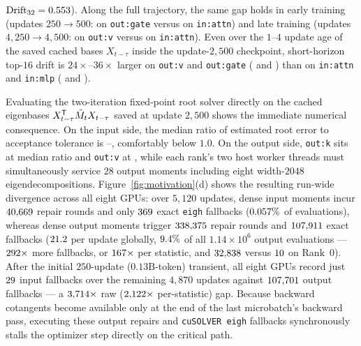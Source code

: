  $\mathrm{Drift}_{32} = 0.553{}$).
Along the full  trajectory, the same gap holds in early training (updates $250\to 500$:
\motOutGateEarlyDriftTopSixteen{} on \texttt{out:gate} versus
\motInAttnEarlyDriftTopSixteen{} on \texttt{in:attn}) and late training (updates
$4{,}250\to 4{,}500$: \motOutVLateDriftTopSixteen{} on \texttt{out:v} versus
\motInAttnLateDriftTopSixteen{} on \texttt{in:attn}). Even over the $1$--$4$
update age of the saved cached bases $X_{t-\tau}$ inside the update-$2{,}500$
checkpoint, short-horizon top-$16$ drift is $24\times$--$36\times$ larger on
\texttt{out:v} and \texttt{out:gate} (\motOutVShortDriftTopSixteen{} and
\motOutGateShortDriftTopSixteen{}) than on \texttt{in:attn} and \texttt{in:mlp}
(\motInAttnShortDriftTopSixteen{} and \motInMlpShortDriftTopSixteen{}).

Evaluating the two-iteration fixed-point root solver directly on the cached
eigenbases $X_{t-\tau}^{{\mathsf T}}\tilde M_t X_{t-\tau}$ saved at update $2{,}500$
shows the immediate numerical consequence. On the input side, the median ratio of
estimated root error to acceptance tolerance is
\motInAttnCachedEstOverTolMed{}--\motInOCachedEstOverTolMed{}, comfortably below
$1.0$. On the output side, \texttt{out:k} sits at median ratio
\motOutKCachedEstOverTolMed{} and \texttt{out:v} at
\motOutVCachedEstOverTolMed{}, while each rank's two host worker threads must
simultaneously service $28$ output moments including eight width-$2048$
eigendecompositions. Figure~\ref{fig:motivation}(d) shows the resulting
run-wide divergence across all eight GPUs: over $5{,}120$ updates, dense input
moments incur $40{,}669{}$ repair rounds and only $369{}$
exact \texttt{eigh} fallbacks ($0.057\%$ of evaluations), whereas
dense output moments trigger $338{,}375{}$ repair rounds and
$107{,}911{}$ exact fallbacks ($21.2{}$ per update globally,
$9.4\%$ of all $1.14\times 10^6$ output evaluations ---
$292\times$ more fallbacks, or $167\times$ per
statistic, and $32{,}838{}$ versus $10{}$ on Rank~0).
After the initial $250$-update ($0.13\text{B}$-token) transient, all eight GPUs
record just $29{}$ input fallbacks over the remaining $4{,}870$
updates against $107{,}701{}$ output fallbacks --- a
$3{,}714\times$ raw ($2{,}122\times$
per-statistic) gap. Because backward cotangents become available only at the end
of the last microbatch's backward pass, executing these output repairs and
\texttt{cuSOLVER eigh} fallbacks synchronously stalls the optimizer step
directly on the critical path.

